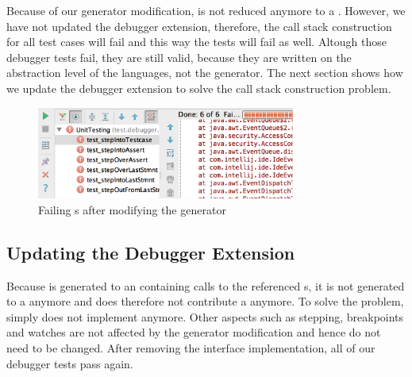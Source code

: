 Because of our generator modification,  is not
reduced anymore to a . However, we have not updated the
debugger extension, therefore, the call stack construction for all test cases
will fail and this way the tests will fail as well. Altough those debugger tests
fail, they are still valid, because they are written on the abstraction level of
the languages, not the generator. The next section shows how we update the
debugger extension to solve the call stack construction problem.

\begin{figure}[h]
	\vspace{-2mm}
	\centering
    \includegraphics[width=8.5cm]{./figures/failingDebuggerTests.png} 
    \vspace{-3mm}
	\caption{Failing s after modifying the generator}
	\label{fig:TestExecution2}
	\vspace{-2mm}
\end{figure}

\subsection{Updating the Debugger Extension}

Because  is generated to an  containing
calls to the referenced s, it is not generated to a  anymore
and does therefore not contribute a  anymore. To solve the
problem,  simply does not implement
 anymore. Other aspects such as stepping, breakpoints
and watches are not affected by the generator modification and hence do not need
to be changed. After removing the interface implementation, all of our debugger
tests pass again.